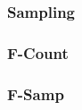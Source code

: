 \begin{frame}
	\frametitle{Sampling}
	\centering
\end{frame}

\begin{frame}
	\frametitle{F-Count}
	\centering
\end{frame}

\begin{frame}
	\frametitle{F-Samp}
	\centering
\end{frame}

